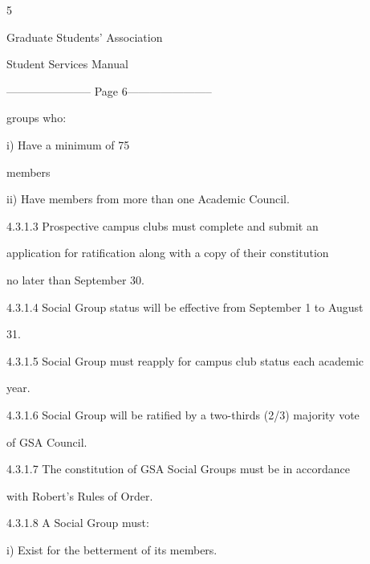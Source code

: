                                                   5  



                                   Graduate Students’ Association  



                                        Student Services Manual  



  


----------------------- Page 6-----------------------

              groups who:   



        i)      Have a minimum of 75%

                members   



        ii)     Have members from more than one Academic Council.   



4.3.1.3       Prospective      campus       clubs    must     complete      and     submit     an  

              application for ratification along with a copy of their constitution  

              no later than September 30.   



4.3.1.4       Social Group status will be effective from September 1 to August  

              31.   



4.3.1.5       Social Group must reapply for campus club status each academic  

              year.   



4.3.1.6       Social Group will be ratified by a two-thirds (2/3) majority vote  

              of GSA Council.   



4.3.1.7       The  constitution  of  GSA  Social  Groups  must  be  in  accordance  

              with Robert’s Rules of Order.   



4.3.1.8       A Social Group must:   



        i)      Exist for the betterment of its members.   



